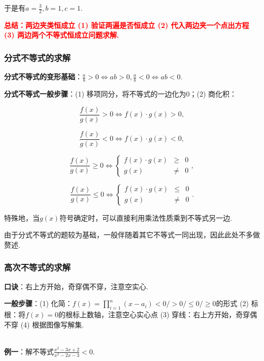 \documentclass[8pt]{article}
\begin{document}
					于是有$\displaystyle a=\frac{3}{2}, b=1, c=1.$

					\textcolor{red}{\textbf{总结：两边夹类恒成立 (1) 验证两遍是否恒成立 (2) 代入两边夹一个点出方程 (3) 两边两个不等式恒成立问题求解.}}

			\subsubsection{分式不等式的求解}
				\textbf{分式不等式的变形基础}：$\displaystyle \frac{a}{b}>0\Leftrightarrow ab>0, \frac{a}{b}<0\Leftrightarrow ab<0.$

				\textbf{分式不等式一般步骤}：(1) 移项同分，将不等式的一边化为$0$；(2) 商化积：

				$$
				\frac{f(x)}{g(x)}>0 \Leftrightarrow f(x)\cdot g(x)>0,
				$$

				$$
				\frac{f(x)}{g(x)}<0 \Leftrightarrow f(x)\cdot g(x)<0,
				$$

				$$
				\frac{f(x)}{g(x)}\geq 0 \Leftrightarrow \left\{
				\begin{array}{rcl}
				f(x)\cdot g(x)&\geq&0\\
				g(x)&\neq&0
				\end{array}\right.,
				$$

				$$
				\frac{f(x)}{g(x)}\leq 0 \Leftrightarrow \left\{
				\begin{array}{rcl}
				f(x)\cdot g(x)&\leq&0\\
				g(x)&\neq&0
				\end{array}\right..
				$$

				特殊地，当$g(x)$符号确定时，可以直接利用乘法性质乘到不等式另一边.

				由于分式不等式的题较为基础，一般伴随着其它不等式一同出现，因此此处不多做赘述.

			\subsubsection{高次不等式的求解}
				\textbf{口诀}：右上方开始，奇穿偶不穿，注意空实心.
				
				\textbf{一般步骤}：(1) 化简：$\displaystyle f(x)=\prod_{i=1}^{n} (x-a_i) <0 / >0 / \leq 0 / \geq 0$的形式 (2) 标根：将$f(x)=0$的根标上数轴，注意空心实心点 (3) 穿线：右上方开始，奇穿偶不穿 (4) 根据图像写解集.

				~\\

				\textbf{例一}：解不等式$\displaystyle \frac{x^2-3x+2}{x^2-2x-3}<0.$
					~\\
\end{document}
